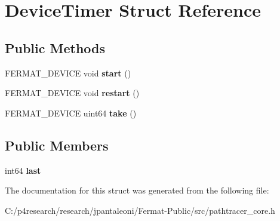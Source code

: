\hypertarget{struct_device_timer}{}\section{Device\+Timer Struct Reference}
\label{struct_device_timer}
\subsection*{Public Methods}
\begin{DoxyCompactItemize}
\item 
\mbox{\label{struct_device_timer_ab81167b2d53044458cb1cfd80062a6d6}} 
F\+E\+R\+M\+A\+T\+\_\+\+D\+E\+V\+I\+CE void {\bfseries start} ()
\item 
\mbox{\label{struct_device_timer_a3cc1d92c4b49453ebfb33cb9ec23102d}} 
F\+E\+R\+M\+A\+T\+\_\+\+D\+E\+V\+I\+CE void {\bfseries restart} ()
\item 
\mbox{\label{struct_device_timer_a22f8a199278862a0aceeb74017cfa13d}} 
F\+E\+R\+M\+A\+T\+\_\+\+D\+E\+V\+I\+CE uint64 {\bfseries take} ()
\end{DoxyCompactItemize}
\subsection*{Public Members}
\begin{DoxyCompactItemize}
\item 
\mbox{\label{struct_device_timer_a76f4100ceb470caa1823e7af8c2d3eeb}} 
int64 {\bfseries last}
\end{DoxyCompactItemize}


The documentation for this struct was generated from the following file\+:\begin{DoxyCompactItemize}
\item 
C\+:/p4research/research/jpantaleoni/\+Fermat-\/\+Public/src/pathtracer\+\_\+core.\+h\end{DoxyCompactItemize}
